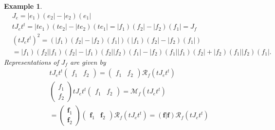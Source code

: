 \documentclass[aps,preprint]{revtex4}
\newtheorem{example}[theorem]{Example}
\begin{document}
\begin{example}
\begin{align}
& J_{e}=\left\vert e_{1}\right) \left( e_{2}\right\vert -\left\vert
e_{2}\right) \left( e_{1}\right\vert \\
& tJ_{e}t^{t}=\left\vert te_{1}\right) \left( te_{2}\right\vert -\left\vert
te_{2}\right) \left( te_{1}\right\vert =\left\vert f_{1}\right) \left(
f_{2}\right\vert -\left\vert f_{2}\right) \left( f_{1}\right\vert =J_{f} \\
& \left( tJ_{e}t^{t}\right) ^{2}=\left( \left\vert f_{1}\right) \left(
f_{2}\right\vert -\left\vert f_{2}\right) \left( f_{1}\right\vert \right)
\left( \left\vert f_{1}\right) \left( f_{2}\right\vert -\left\vert
f_{2}\right) \left( f_{1}\right\vert \right) \\
& =\left\vert f_{1}\right) \left( f_{2}\right\vert \left\vert f_{1}\right)
\left( f_{2}\right\vert -\left\vert f_{1}\right) \left( f_{2}\right\vert
\left\vert f_{2}\right) \left( f_{1}\right\vert -\left\vert f_{2}\right)
\left( f_{1}\right\vert \left\vert f_{1}\right) \left( f_{2}\right\vert
+\left\vert f_{2}\right) \left( f_{1}\right\vert \left\vert f_{2}\right)
\left( f_{1}\right\vert .
\end{align}%
Representations of $J_{f}$ are given by 
\begin{align}
& tJ_{e}t^{t}\left( 
\begin{array}{cc}
f_{1} & f_{2}%
\end{array}%
\right) =\left( 
\begin{array}{cc}
f_{1} & f_{2}%
\end{array}%
\right) \mathcal{R}_{f}\left( tJ_{e}t^{t}\right) \\
& \left( 
\begin{array}{c}
f_{1} \\ 
f_{2}%
\end{array}%
\right) tJ_{e}t^{t}\left( 
\begin{array}{cc}
f_{1} & f_{2}%
\end{array}%
\right) =\mathcal{M}_{f}\left( tJ_{e}t^{t}\right) \\
& =\left( 
\begin{array}{c}
\mathbf{f}_{1} \\ 
\mathbf{f}_{2}%
\end{array}%
\right) \left( 
\begin{array}{cc}
\mathbf{f}_{1} & \mathbf{f}_{2}%
\end{array}%
\right) \mathcal{R}_{f}\left( tJ_{e}t^{t}\right) =\left( \left. \mathbf{f}%
\right\vert \mathbf{f}\right) \mathcal{R}_{f}\left( tJ_{e}t^{t}\right)

\end{align}
\end{example}
\end{document}
